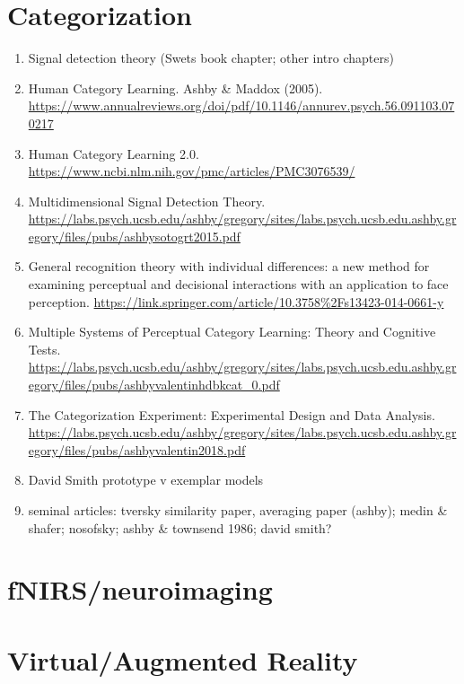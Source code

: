 \documentclass[
]{book}
\providecommand{\tightlist}{%
  \setlength{\itemsep}{0pt}\setlength{\parskip}{0pt}}
\begin{document}
\hypertarget{categorization}{%
\section{Categorization}\label{categorization}}

\begin{enumerate}
\def\labelenumi{\arabic{enumi}.}
\setcounter{enumi}{-1}
\tightlist
\item
  Signal detection theory (Swets book chapter; other intro chapters)
\item
  Human Category Learning. Ashby \& Maddox (2005). \url{https://www.annualreviews.org/doi/pdf/10.1146/annurev.psych.56.091103.070217}
\item
  Human Category Learning 2.0. \url{https://www.ncbi.nlm.nih.gov/pmc/articles/PMC3076539/}
\item
  Multidimensional Signal Detection Theory. \url{https://labs.psych.ucsb.edu/ashby/gregory/sites/labs.psych.ucsb.edu.ashby.gregory/files/pubs/ashbysotogrt2015.pdf}
\item
  General recognition theory with individual differences: a new method for examining perceptual and decisional interactions with an application to face perception. \url{https://link.springer.com/article/10.3758\%2Fs13423-014-0661-y}
\item
  Multiple Systems of Perceptual
  Category Learning: Theory and
  Cognitive Tests. \url{https://labs.psych.ucsb.edu/ashby/gregory/sites/labs.psych.ucsb.edu.ashby.gregory/files/pubs/ashbyvalentinhdbkcat_0.pdf}
\item
  The Categorization Experiment:
  Experimental Design and Data Analysis. \url{https://labs.psych.ucsb.edu/ashby/gregory/sites/labs.psych.ucsb.edu.ashby.gregory/files/pubs/ashbyvalentin2018.pdf}
\item
  David Smith prototype v exemplar models
\item
  seminal articles: tversky similarity paper, averaging paper (ashby); medin \& shafer; nosofsky; ashby \& townsend 1986; david smith?
\end{enumerate}

\hypertarget{fnirsneuroimaging}{%
\section{fNIRS/neuroimaging}\label{fnirsneuroimaging}}

\hypertarget{virtualaugmented-reality}{%
\section{Virtual/Augmented Reality}\label{virtualaugmented-reality}}
\end{document}
